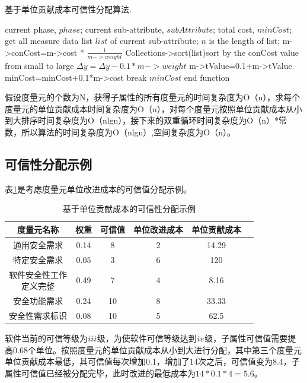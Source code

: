 \begin{algorithm}
	\caption{基于单位贡献成本可信性分配算法.}
	\label{}
	\begin{algorithmic}[1]
		\REQUIRE current phase, $phase$;
		         current sub-attribute, $subAttribute$;
		\ENSURE total cost, $minCost$;
		\STATE get all measure data list $list$ of current sub-attribute;
		\STATE $n$ is the length of list;
		 \STATE m->conCost=m->cost * $\frac{1}{m->weight}$
		\ENDFOR
		\STATE Collections->sort(list){sort by the conCost value from small to large}
		  \STATE $\Delta y=\Delta y-0.1*m->weight$
		  \STATE m->tValue=0.1+m->tValue
		  \STATE minCost=minCost+0.1*m->cost
		   \STATE break
		  \ENDIF
		 \ENDWHILE
		\ENDFOR
		\RETURN $minCost$
		\STATE end function
	\end{algorithmic}
\end{algorithm}


假设度量元的个数为N，获得子属性的所有度量元的时间复杂度为O（n），求每个度量元的单位贡献成本时间复杂度为O（n），对每个度量元按照单位贡献成本从小到大排序时间复杂度为O（nlgn），接下来的双重循环时间复杂度为O（n）*常数，所以算法的时间复杂度为O（nlgn）,空间复杂度为O（n）。


\subsection{可信性分配示例\uppercase\expandafter{}}
表\ref{tab-4-6}是考虑度量元单位改进成本的可信值分配示例。
\begin{table}[!ht]
	\centering
	\renewcommand\arraystretch{1.3}
	\caption{基于单位贡献成本的可信性分配示例}
	\begin{tabular}{|c|c|c|c|c|c|}
		\hline
		\textbf{度量元名称} & \textbf{权重} & \textbf{可信值} & \textbf{单位改进成本} & \textbf{单位贡献成本}\\ 
		\hline
		通用安全需求 & 0.14 & 8 & 2 & 14.29 \\
		\hline
		特定安全需求 & 0.05 & 3 & 6 & 120\\
		\hline
		\tabincell{c}{软件安全性工作\\定义完整} & 0.49 & 7 & 4 & 8.16\\
		\hline
		安全功能需求  &  0.24 & 10 & 8 &  33.33  \\
		\hline
		安全性需求标识 & 0.08 & 10  & 5 &  62.5  \\
		\hline
	\end{tabular}
	\label{tab-4-6}
\end{table}

软件当前的可信等级为$\uppercase\expandafter{\romannumeral3}$级，为使软件可信等级达到$\uppercase\expandafter{\romannumeral4}$级，子属性可信值需要提高0.68个单位。按照度量元的单位贡献成本从小到大进行分配，其中第三个度量元单位贡献成本最低，其可信值每次增加0.1，增加了14次之后，可信值变为8.4，子属性可信值已经被分配完毕，此时改进的最低成本为$14*0.1*4=5.6$。







